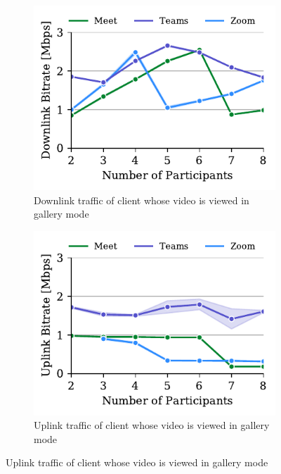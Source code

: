 \begin{figure}[tb!]
\begin{subfigure}[t]{.33\textwidth}
  \centering
   \captionsetup{width=.9\linewidth}
    \includegraphics[width=1\textwidth,keepaspectratio]{../figures/modality/speaker_recv.pdf}
    \caption{Downlink traffic of client whose video is viewed in gallery mode}
    \label{fig:gallery-recv}
\end{subfigure}
\hfill
\begin{subfigure}[t]{.33\textwidth}
  \centering
   \captionsetup{width=.9\linewidth}
    \includegraphics[width=1\textwidth,keepaspectratio]{../figures/modality/gallery_send.pdf}
    \caption{Uplink traffic of client whose video is viewed in gallery mode}

\end{subfigure}
\end{figure}
